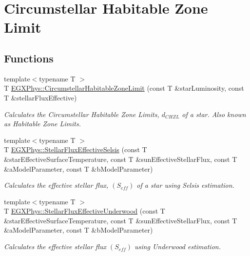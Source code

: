 \hypertarget{group___e_g_x_phys-_circumstellar_habitable_zone_limit}{}\section{Circumstellar Habitable Zone Limit}
\label{group___e_g_x_phys-_circumstellar_habitable_zone_limit}
\subsection*{Functions}
\begin{DoxyCompactItemize}
\item 
{\footnotesize template$<$typename T $>$ }\\T \mbox{\hyperlink{group___e_g_x_phys-_circumstellar_habitable_zone_limit_ga23a8f602461ea3257e8767b1d455c383}{E\+G\+X\+Phys\+::\+Circumstellar\+Habitable\+Zone\+Limit}} (const T \&star\+Luminosity, const T \&stellar\+Flux\+Effective)
\begin{DoxyCompactList}\small\item\em Calculates the Circumstellar Habitable Zone Limits, $d_{CHZL}$ of a star. Also known as Habitable Zone Limits. \end{DoxyCompactList}\item 
{\footnotesize template$<$typename T $>$ }\\T \mbox{\hyperlink{group___e_g_x_phys-_circumstellar_habitable_zone_limit_ga3ce3a04fec7b1c8fb66ac54270ce3902}{E\+G\+X\+Phys\+::\+Stellar\+Flux\+Effective\+Selsis}} (const T \&star\+Effective\+Surface\+Temperature, const T \&sun\+Effective\+Stellar\+Flux, const T \&a\+Model\+Parameter, const T \&b\+Model\+Parameter)
\begin{DoxyCompactList}\small\item\em Calculates the effective stellar flux, $(S_{eff})$ of a star using Selsis estimation. \end{DoxyCompactList}\item 
{\footnotesize template$<$typename T $>$ }\\T \mbox{\hyperlink{group___e_g_x_phys-_circumstellar_habitable_zone_limit_ga34d1e39bce17904bc6d383f1935c79d6}{E\+G\+X\+Phys\+::\+Stellar\+Flux\+Effective\+Underwood}} (const T \&star\+Effective\+Surface\+Temperature, const T \&sun\+Effective\+Stellar\+Flux, const T \&a\+Model\+Parameter, const T \&b\+Model\+Parameter)
\begin{DoxyCompactList}\small\item\em Calculates the effective stellar flux $(S_{eff})$ using Underwood estimation. \end{DoxyCompactList}\item 

\end{DoxyCompactItemize}

